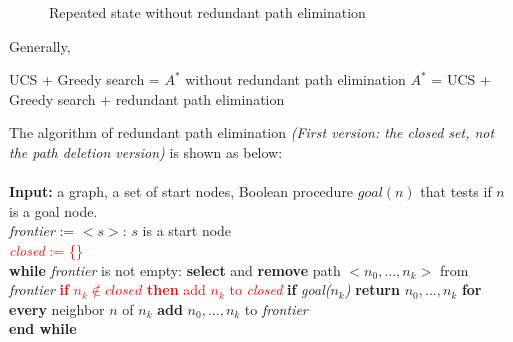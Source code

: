 \begin{figure}[htbp]
    \centering
    \caption{Repeated state without redundant path elimination}
    \label{fig:repeated_state_without_rpe}
\end{figure}

\noindent
Generally, 
\begin{outline}
    \1 UCS + Greedy search = $A^{*}$ without redundant path elimination
    \1 $A^{*}$ = UCS + Greedy search + redundant path elimination
\end{outline}

\noindent
The algorithm of redundant path elimination \emph{(First version: the closed set, not the path deletion version)} is shown as below: \\ \\
\textbf{Input:}
\tabto{5mm} a graph,
\tabto{5mm} a set of start nodes,
\tabto{5mm} Boolean procedure $goal(n)$ that tests if $n$ is a goal node. \\
\emph{frontier} := {$<s>$: $s$ is a start node} \\
\textcolor{red}{\emph{closed} := \{\}} \\
\textbf{while} \emph{frontier} is not empty:
\tabto{5mm} \textbf{select} and \textbf{remove} path $<n_{0},...,n_{k}>$ from \emph{frontier}
\tabto{5mm} \textcolor{red}{\textbf{if} $n_{k} \notin closed$ \textbf{then}}
\tabto{10mm} \textcolor{red}{add $n_{k}$ to \emph{closed}}
\tabto{10mm} \textbf{if} \emph{goal($n_{k}$)}
\tabto{15mm} \textbf{return} $n_{0},...,n_{k}$
\tabto{10mm} \textbf{for every} neighbor $n$ of $n_{k}$
\tabto{15mm} \textbf{add} $n_{0},...,n_{k}$ to \emph{frontier} \\
\textbf{end while} \\


